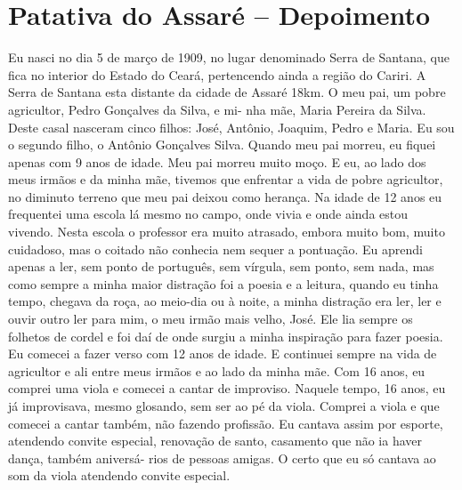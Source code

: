 \chapter{Patativa do Assaré -- Depoimento}

Eu nasci no dia 5 de março de 1909, no lugar denominado Serra de
Santana, que fica no interior do Estado do Ceará, pertencendo ainda a
região do Cariri. A Serra de Santana esta distante da cidade de Assaré
18km. O meu pai, um pobre agricultor, Pedro Gonçalves da Silva, e mi-
nha mãe, Maria Pereira da Silva. Deste casal nasceram cinco filhos:
José, Antônio, Joaquim, Pedro e Maria. Eu sou o segundo filho, o
Antônio Gonçalves Silva. Quando meu pai morreu, eu fiquei apenas com 9
anos de idade. Meu pai morreu muito moço. E eu, ao lado dos meus irmãos
e da minha mãe, tivemos que enfrentar a vida de pobre agricultor, no
diminuto terreno que meu pai deixou como herança. Na idade de 12 anos
eu frequentei uma escola lá mesmo no campo, onde vivia e onde ainda
estou vivendo. Nesta escola o professor era muito atrasado, embora muito
bom, muito cuidadoso, mas o coitado não conhecia nem sequer a pontuação.
Eu aprendi apenas a ler, sem ponto de português, sem vírgula, sem ponto,
sem nada, mas como sempre a minha maior distração foi a poesia e a
leitura, quando eu tinha tempo, chegava da roça, ao meio-dia ou à noite,
a minha distração era ler, ler e ouvir outro ler para mim, o meu irmão
mais velho, José. Ele lia sempre os folhetos de cordel e foi daí de
onde surgiu a minha inspiração para fazer poesia. Eu comecei a fazer
verso com 12 anos de idade. E continuei sempre na vida de agricultor e
ali entre meus irmãos e ao lado da minha mãe. Com 16 anos, eu comprei
uma viola e comecei a cantar de improviso. Naquele tempo, 16 anos, eu já improvisava, mesmo glosando, sem ser ao pé
da viola. Comprei a viola e que comecei a cantar também, não fazendo
profissão. Eu cantava assim por esporte, atendendo convite especial,
renovação de santo, casamento que não ia haver dança, também aniversá-
rios de pessoas amigas. O certo que eu só cantava ao som da viola
atendendo convite especial.

